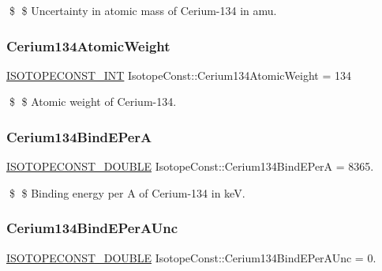 \$ \$ Uncertainty in atomic mass of Cerium-\/134 in amu. \mbox{\label{group___isotope_const-_cerium-_ce134_ga35126b32b7653acd8e84456aa1600b23}} 
\subsubsection{\texorpdfstring{Cerium134\+Atomic\+Weight}{Cerium134AtomicWeight}}
{\footnotesize\ttfamily \mbox{\hyperlink{group___isotope_const-_macros_ga5f18360b3e99483a35c32d789e62621c}{I\+S\+O\+T\+O\+P\+E\+C\+O\+N\+S\+T\+\_\+\+I\+NT}} Isotope\+Const\+::\+Cerium134\+Atomic\+Weight = 134}

\$ \$ Atomic weight of Cerium-\/134. \mbox{\label{group___isotope_const-_cerium-_ce134_gaf0db031636700068ac6e7c58869923c1}} 
\subsubsection{\texorpdfstring{Cerium134\+Bind\+E\+PerA}{Cerium134BindEPerA}}
{\footnotesize\ttfamily \mbox{\hyperlink{group___isotope_const-_macros_ga8f45a7272ce02c0b4c65c44636ed719a}{I\+S\+O\+T\+O\+P\+E\+C\+O\+N\+S\+T\+\_\+\+D\+O\+U\+B\+LE}} Isotope\+Const\+::\+Cerium134\+Bind\+E\+PerA = 8365.}

\$ \$ Binding energy per A of Cerium-\/134 in keV. \mbox{\label{group___isotope_const-_cerium-_ce134_ga1cb01df930cfeb3cc6877a66835d50b3}} 
\subsubsection{\texorpdfstring{Cerium134\+Bind\+E\+Per\+A\+Unc}{Cerium134BindEPerAUnc}}
{\footnotesize\ttfamily \mbox{\hyperlink{group___isotope_const-_macros_ga8f45a7272ce02c0b4c65c44636ed719a}{I\+S\+O\+T\+O\+P\+E\+C\+O\+N\+S\+T\+\_\+\+D\+O\+U\+B\+LE}} Isotope\+Const\+::\+Cerium134\+Bind\+E\+Per\+A\+Unc = 0.}

